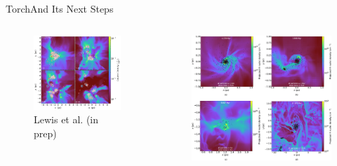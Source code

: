 \documentclass[aspectratio=169]{beamer}
\begin{document}
\begin{frame}{Torch}{And Its Next Steps}
    \begin{columns}
        \begin{column}{0.42\textwidth}
            \begin{figure}[h!]
                \centering
                \includegraphics[width=\linewidth]{../images/all_runs_density_grid_time_labels.png} \\
                Lewis et al. (in prep)
                \label{fig:jwst}
            \end{figure}
        \end{column}
        \begin{column}{0.4\textwidth}
            \begin{figure}[h!]
                \centering
                \includegraphics[width=\linewidth]{../images/josh_density_grid.jpeg} \\

\end{figure}
\end{column}
\end{columns}
\end{frame}
\end{document}
